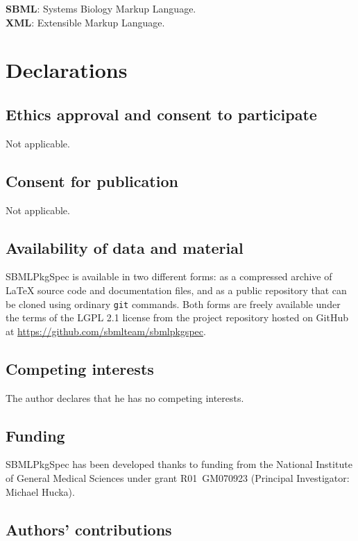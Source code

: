 \documentclass{bmcart}
\newcommand{\sbmlpkg}{SBMLPkgSpec}
\newcommand{\githuburl}{https://github.com/sbmlteam/sbmlpkgspec}
\begin{document}
\textbf{SBML}: Systems Biology Markup Language.\\
\textbf{XML}: Extensible Markup Language.


\section*{Declarations}

\subsection*{Ethics approval and consent to participate}

Not applicable.

\subsection*{Consent for publication}

Not applicable.

\subsection*{Availability of data and material}

\sbmlpkg{} is available in two different forms: as a compressed archive of LaTeX source code and documentation files, and as a public repository that can be cloned using ordinary \texttt{git} commands. Both forms are freely available under the terms of the LGPL 2.1 license from the project repository hosted on GitHub at \url{\githuburl}.

\subsection*{Competing interests}

The author declares that he has no competing interests.

\subsection*{Funding}

\sbmlpkg{} has been developed thanks to funding from the National Institute of General Medical Sciences under grant R01~GM070923 (Principal Investigator: Michael Hucka).

\subsection*{Authors' contributions}
\end{document}
